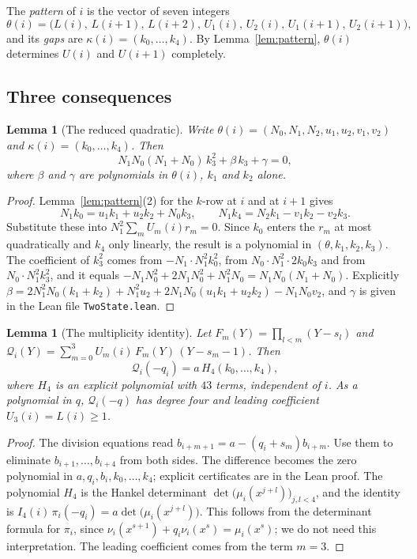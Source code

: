 \documentclass[11pt]{amsart}
\newtheorem{lemma}[theorem]{Lemma}
\theoremstyle{definition}
\theoremstyle{remark}
\newcommand{\lean}[1]{\texttt{#1}}
\begin{document}
The \emph{pattern} of $i$ is the vector of seven integers
\[
\theta(i)=\bigl(L(i),\,L(i+1),\,L(i+2),\,U_1(i),\,U_2(i),\,U_1(i+1),\,U_2(i+1)\bigr),
\]
and its \emph{gaps} are $\kappa(i)=(k_0,\dots,k_4)$. By Lemma~\ref{lem:pattern},
$\theta(i)$ determines $U(i)$ and $U(i+1)$ completely.

\subsection{Three consequences}

\begin{lemma}[The reduced quadratic]\label{lem:quad}
Write $\theta(i)=(N_0,N_1,N_2,u_1,u_2,v_1,v_2)$ and $\kappa(i)=(k_0,\dots,k_4)$. Then
\[
N_1N_0(N_1+N_0)\,k_3^2+\beta\,k_3+\gamma=0,
\]
where $\beta$ and $\gamma$ are polynomials in $\theta(i)$, $k_1$ and $k_2$ alone.
\end{lemma}

\begin{proof}
Lemma~\ref{lem:pattern}(2) for the $k$-row at $i$ and at $i+1$ gives
\[
N_1k_0=u_1k_1+u_2k_2+N_0k_3,\qquad N_1k_4=N_2k_1-v_1k_2-v_2k_3 .
\]
Substitute these into $N_1^2\sum_mU_m(i)r_m=0$. Since $k_0$ enters the $r_m$ at most
quadratically and $k_4$ only linearly, the result is a polynomial in $(\theta,k_1,k_2,k_3)$.
The coefficient of $k_3^2$ comes from $-N_1\cdot N_1^2k_0^2$, from $N_0\cdot N_1^2\cdot 2k_0k_3$ and
from $N_0\cdot N_1^2k_3^2$, and it equals
$-N_1N_0^2+2N_1N_0^2+N_1^2N_0=N_1N_0(N_1+N_0)$. Explicitly
$\beta=2N_1^2N_0(k_1+k_2)+N_1^2u_2+2N_1N_0(u_1k_1+u_2k_2)-N_1N_0v_2$, and $\gamma$ is given in
the Lean file \lean{TwoState.lean}.
\end{proof}

\begin{lemma}[The multiplicity identity]\label{lem:multid}
Let $F_m(Y)=\prod_{l<m}(Y-s_l)$ and $\mathcal Q_i(Y)=\sum_{m=0}^{3}U_m(i)\,F_m(Y)\,(Y-s_m-1)$.
Then
\[
\mathcal Q_i(-q_i)=a\,H_4(k_0,\dots,k_4),
\]
where $H_4$ is an explicit polynomial with $43$ terms, independent of $i$. As a polynomial in
$q$, $\mathcal Q_i(-q)$ has degree four and leading coefficient $U_3(i)=L(i)\ge1$.
\end{lemma}

\begin{proof}
The division equations read $b_{i+m+1}=a-(q_i+s_m)b_{i+m}$. Use them to eliminate
$b_{i+1},\dots,b_{i+4}$ from both sides. The difference becomes the zero polynomial in
$a,q_i,b_i,k_0,\dots,k_4$; explicit certificates are in the Lean proof. The polynomial $H_4$ is
the Hankel determinant $\det\bigl(\mu_i(x^{j+l})\bigr)_{j,l<4}$, and the identity is
$I_4(i)\,\pi_i(-q_i)=a\det\bigl(\mu_i(x^{j+l})\bigr)$. This follows from the determinant formula for
$\pi_i$, since $\nu_i(x^{s+1})+q_i\nu_i(x^s)=\mu_i(x^s)$; we do not need this interpretation. The
leading coefficient comes from the term $m=3$.
\end{proof}
\end{document}
